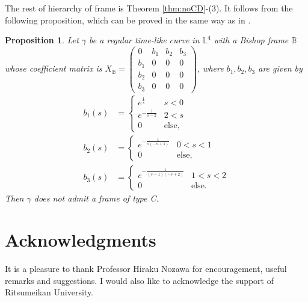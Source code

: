 \documentclass[a4paper]{amsart}
\newtheorem{proposition}[theorem]{Proposition}
\theoremstyle{definition}
\theoremstyle{remark}
\newcommand{\BB}{\mathbb{B}}
\newcommand{\LL}{\mathbb{L}}
\numberwithin{equation}{section}
\begin{document}

The rest of hierarchy of frame is Theorem \ref{thm:noCD}-(3). It follows from the following proposition, which can be proved in the same way as in \cite{NN}.
\begin{proposition}\label{prop:typeC}
Let $\gamma$ be a regular time-like curve in $\LL^4$ with a Bishop frame $\BB$ whose coefficient matrix is $X_{\BB}=\begin{pmatrix}
0&b_{1}&b_{2}&b_{3}\\
b_{1}&0&0&0\\
b_{2}&0&0&0\\
b_{3}&0&0&0
\end{pmatrix}$, where $b_1, b_2, b_3$ are given by
\begin{align*}
b_{1}(s) & =\begin{cases}
e^{\frac{1}{s}} & s<0 \\
e^{-\frac{1}{s-2}} & 2<s\\
0 & \text{else},
\end{cases} \\
b_{2}(s) & =\begin{cases}
e^{-\frac{1}{s(-s+1)}} & 0<s<1 \\
0 & \text{else},
\end{cases} \\
b_{3}(s) & =\begin{cases}
e^{-\frac{1}{(s-1)(-s+2)}} & 1<s<2 \\
0 & \text{else}.
\end{cases}
\end{align*}
Then $\gamma$ does not admit a frame of type C.
\end{proposition}
\section*{Acknowledgments}
It is a pleasure to thank Professor Hiraku Nozawa for encouragement, useful remarks and suggestions. I would also like to acknowledge the support of Ritsumeikan University.
\end{document}
